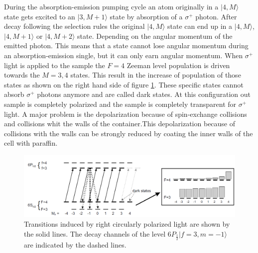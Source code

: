 \documentclass[a4paper,kul]{kulakarticle} %
\begin{document}
During the absorption-emission pumping cycle an atom originally in a $|4,M\rangle$ state gets excited to an $|3,M+1\rangle$ state by absorption of a $\sigma^{+}$ photon. After decay following the selection rules the original $|4,M\rangle$ state can end up in a $|4,M\rangle$, $|4,M+1\rangle$ or $|4,M+2\rangle$ state. Depending on the angular momentum of the emitted photon. This means that a state cannot lose angular momentum during an absorption-emission single, but it can only earn angular momentum. When $\sigma^{+}$ light is applied to the sample the $F=4$ Zeeman level population is driven towards the $M = 3,4$ states. This result in the increase of population of those states as shown on the right hand side of figure \ref{fig: transitions}. These specific states cannot absorb $\sigma^{+}$ photons anymore and are called dark states. At this configuration out sample is completely polarized and the sample is completely transparent for $\sigma^{+}$ light. A major problem is the depolarization because of spin-exchange collisions and collisions whit the walls of the container.This depolarization because of collisions with the walls can be strongly reduced by coating the inner walls of the cell with paraffin. 




\begin{figure}[h!]
	\centering
	\includegraphics[width=\linewidth]{transitions}
	\caption{Transitions induced by right circularly polarized light are shown by the solid lines. The decay channels of the level $6P_{\frac{1}{2}} |f=3,m=-1\rangle$ are indicated by the dashed lines.}
	\label{fig: transitions}
\end{figure}
	
\end{document}

